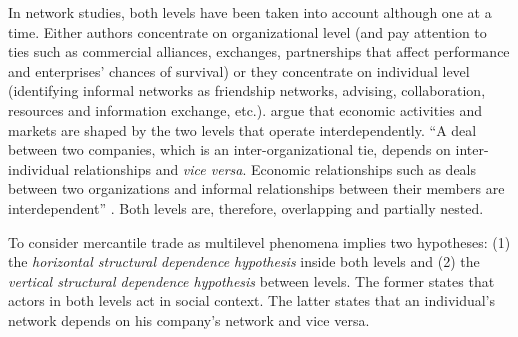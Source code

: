 \documentclass[a4paper, 12pt, openright, oneside, german, french, brazil, english]{abntex2}
\begin{document}
	In network studies, both levels have been taken into account although one at a time. Either authors concentrate on organizational level (and pay attention to ties such as commercial alliances, exchanges, partnerships that affect performance and enterprises' chances of survival) or they concentrate on individual level (identifying informal networks as friendship networks, advising, collaboration, resources and information exchange, etc.).  argue that economic activities and markets are shaped by the two levels that operate interdependently. ``A deal between two companies, which is an inter-organizational tie, depends on inter-individual relationships and \textit{vice versa}. Economic relationships such as deals between two organizations and informal relationships between their members are interdependent'' \cite[p. 246]{brailly2016market}. Both levels are, therefore, overlapping and partially nested.
	
	
	To consider mercantile trade as multilevel phenomena implies two hypotheses: (1) the \textit{horizontal structural dependence hypothesis} inside both levels and (2) the \textit{vertical structural dependence hypothesis} between levels. The former states that actors in both levels act in social context. The latter states that an individual's network depends on his company's network and vice versa.
	
	
\end{document}
